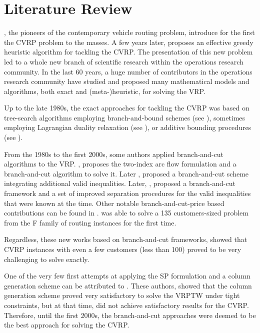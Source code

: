 \section{Literature Review}
\label{sec:intro-literature-review}

\textcite{dantzig1959},
the pioneers of the contemporary vehicle routing problem,
introduce for the first the CVRP problem to the masses.
A few years later, \textcite{clarke1964} proposes
an effective greedy heuristic algorithm for tackling the CVRP.
The presentation of this new problem led to a whole new branch
of scientific research within the operations research community.
In the last 60 years, a huge number of contributors in
the operations research community have studied and proposed many
mathematical models and algorithms, both exact and (meta-)heuristic,
for solving the VRP.

Up to the late 1980s, the exact approaches for tackling the CVRP was
based on tree-search algorithms employing branch-and-bound schemes
(see \textcite{pierce1969, christofides1969a, christofides1981, laporte1986}),
sometimes employing Lagrangian duality relaxation (see \textcite{fisher1994a, miller1995}),
or additive bounding procedures (see \textcite{fischetti1994a, hadjiconstantinou1995}).

From the 1980s to the first 2000s, some authors applied branch-and-cut
algorithms to the VRP.
\textcite{laporte1985}, proposes the two-index arc flow formulation
and a branch-and-cut algorithm to solve it.
Later \textcite{augerat1995a}, proposed a branch-and-cut scheme
integrating additional valid inequalities.
Later, \textcite{lysgaard2004},
proposed a branch-and-cut framework and
a set of improved separation procedures for
the valid inequalities that were known at the time.
Other notable branch-and-cut-price based contributions
can be found in \textcite{araqueg1994, augerat1995, achuthan1996, blasum2000, ralphs2003, achuthan2003, baldacci2004}.
\citeauthor{baldacci2004} was able to solve a
135 customers-sized problem from the F family of routing instances \textcite{fisher1994}
for the first time.

Regardless, these new works based on branch-and-cut frameworks, showed that CVRP instances
with even a few customers (less than 100) proved
to be very challenging to solve exactly.


One of the very few first attempts at applying
the SP formulation and a column generation scheme can
be attributed to \textcite{desrosiers1984, agarwal1989}.
These authors, showed that the column generation scheme proved
very satisfactory to solve the VRPTW under tight constraints,
but at that time, did not achieve satisfactory results for the CVRP.
Therefore, until the first 2000s, the branch-and-cut approaches
were deemed to be the best approach for solving the CVRP.

